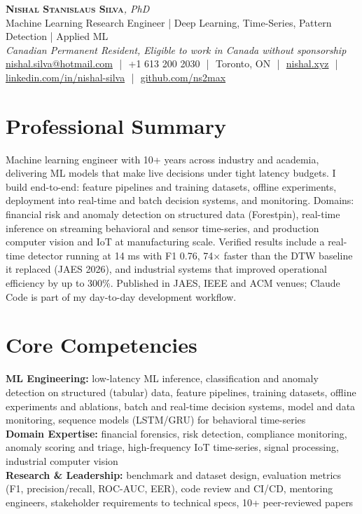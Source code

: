 \documentclass[11pt]{article}
\makeatletter
\newcommand{\cvName}{Nishal Stanislaus Silva}
\newcommand{\cvEmail}{nishal.silva@hotmail.com}
\newcommand{\cvPhone}{+1 613 200 2030}
\newcommand{\cvCity}{Toronto, ON}
\newcommand{\cvSite}{https://nishal.xyz}
\newcommand{\cvLinkedIn}{https://www.linkedin.com/in/nishal-silva}
\newcommand{\cvGitHub}{https://github.com/ns2max}
\newcommand{\cvStatus}{Canadian Permanent Resident, Eligible to work in Canada without sponsorship}
\newcommand{\cvTagline}{Machine Learning Research Engineer | Deep Learning, Time-Series, Pattern Detection | Applied ML}
\makeatother
\begin{document}
\pagestyle{empty}

\begin{center}
    {\LARGE \scshape \textbf{\cvName}}{\large \textit{, PhD}}
    \\[1pt]
    {\small \cvTagline}
    \\[1pt]
    {\footnotesize\textit{\cvStatus}}
    \\[1pt]
    {\small
    \href{mailto:\cvEmail}{\cvEmail}
    \,\,|\,\, \cvPhone
    \,\,|\,\, \cvCity
    \,\,|\,\, \href{\cvSite}{nishal.xyz}
    \,\,|\,\, \href{\cvLinkedIn}{linkedin.com/in/nishal-silva}
    \,\,|\,\, \href{\cvGitHub}{github.com/ns2max}}
\end{center}

\section*{Professional Summary}
Machine learning engineer with 10+ years across industry and academia, delivering ML models that make live decisions under tight latency budgets. I build end-to-end: feature pipelines and training datasets, offline experiments, deployment into real-time and batch decision systems, and monitoring. Domains: financial risk and anomaly detection on structured data (Forestpin), real-time inference on streaming behavioral and sensor time-series, and production computer vision and IoT at manufacturing scale. Verified results include a real-time detector running at 14 ms with F1 0.76, 74$\times$ faster than the DTW baseline it replaced (JAES 2026), and industrial systems that improved operational efficiency by up to 300\%. Published in JAES, IEEE and ACM venues; Claude Code is part of my day-to-day development workflow.

\section*{Core Competencies}
\textbf{ML Engineering:} low-latency ML inference, classification and anomaly detection on structured (tabular) data, feature pipelines, training datasets, offline experiments and ablations, batch and real-time decision systems, model and data monitoring, sequence models (LSTM/GRU) for behavioral time-series\\
\textbf{Domain Expertise:} financial forensics, risk detection, compliance monitoring, anomaly scoring and triage, high-frequency IoT time-series, signal processing, industrial computer vision\\
\textbf{Research \& Leadership:} benchmark and dataset design, evaluation metrics (F1, precision/recall, ROC-AUC, EER), code review and CI/CD, mentoring engineers, stakeholder requirements to technical specs, 10+ peer-reviewed papers
\end{document}
